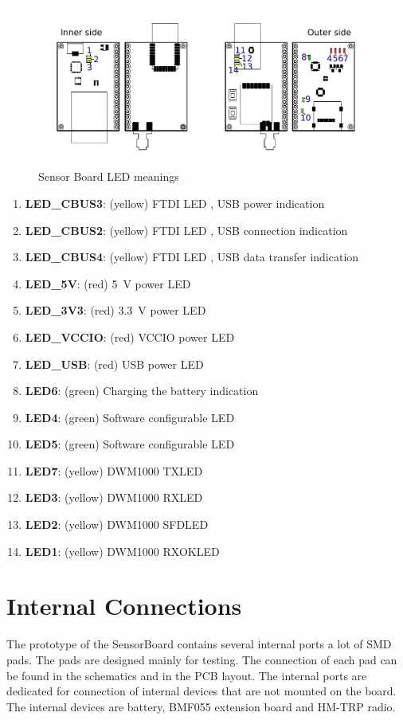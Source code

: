 \begin{figure}[H]
	\centering
	\includegraphics[scale=1]{img/LEDmeanings.pdf}
	\caption{Sensor Board LED meanings}
	\label{fig:LEDmeaning}
\end{figure}

\begin{enumerate}
	\setlength\itemsep{0.2em}
	\item \textbf{LED\_CBUS3}: (yellow) FTDI LED \cite{ftdichip:FT232R}, \ac{USB} power indication
	\item \textbf{LED\_CBUS2}: (yellow) FTDI LED \cite{ftdichip:FT232R}, \ac{USB} connection indication
	\item \textbf{LED\_CBUS4}: (yellow) FTDI LED \cite{ftdichip:FT232R}, \ac{USB} data transfer indication
	\item \textbf{LED\_5V}: (red) \SI{5}{V} power LED
	\item \textbf{LED\_3V3}: (red) \SI{3.3}{V} power LED
	\item \textbf{LED\_VCCIO}: (red) VCCIO power LED
	\item \textbf{LED\_USB}: (red) \ac{USB} power LED
	\item \textbf{LED6}: (green) Charging the battery indication
	\item \textbf{LED4}: (green) Software configurable LED
	\item \textbf{LED5}: (green) Software configurable LED
	\item \textbf{LED7}: (yellow) DWM1000 TXLED \cite{decawave:DWM1000}
	\item \textbf{LED3}: (yellow) DWM1000 RXLED \cite{decawave:DWM1000}
	\item \textbf{LED2}: (yellow) DWM1000 SFDLED \cite{decawave:DWM1000}
	\item \textbf{LED1}: (yellow) DWM1000 RXOKLED \cite{decawave:DWM1000}
\end{enumerate}

\section{Internal Connections}
The prototype of the SensorBoard contains several internal ports a lot of \ac{SMD} pads. The pads are designed mainly for testing. The connection of each pad can be found in the schematics and in the \ac{PCB} layout. The internal ports are dedicated for connection of internal devices that are not mounted on the board. The internal devices are battery, BMF055 \cite{bosch:BMF055} extension board and HM-TRP \cite{HM-TRP} radio.

